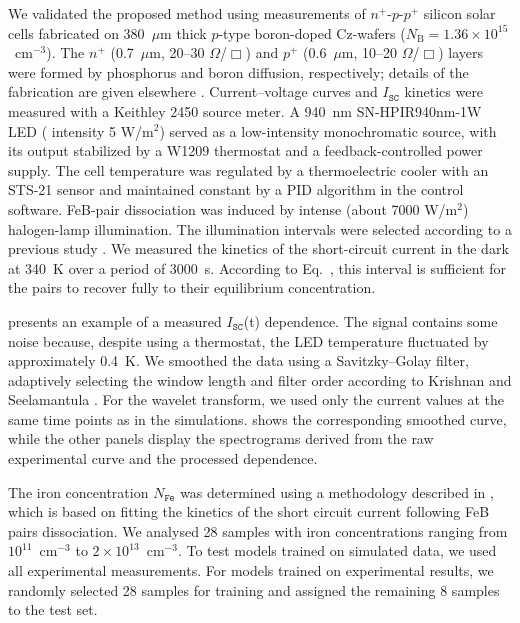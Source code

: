 \documentclass[10pt]{iopart}
\begin{document}
We validated the proposed method using measurements of $n^+$-$p$-$p^+$ silicon solar cells fabricated on 380~$\mu$m thick $p$-type boron-doped Cz-wafers ($N_\mathrm{B}=1.36\times10^{15}$~cm$^{-3}$). 
The $n^+$ (0.7~$\mu$m, 20–30 $\Omega$/$\Box$) and $p^+$ (0.6~$\mu$m, 10–20 $\Omega$/$\Box$) layers were formed by phosphorus and boron diffusion, respectively; details of the fabrication are given elsewhere \cite{Olikh2021JAP}.
Current–voltage curves and $I_\mathtt{SC}$ kinetics were measured with a Keithley 2450 source meter. A 940~nm SN-HPIR940nm-1W LED ( intensity 5 W/m$^{2}$) served as a low-intensity monochromatic source, with its output stabilized by a W1209 thermostat and a feedback-controlled power supply. 
The cell temperature was regulated by a thermoelectric cooler with an STS-21 sensor and maintained constant by a PID algorithm in the control software. 
FeB-pair dissociation was induced by intense (about 7000 W/m$^{2}$) halogen-lamp illumination. 
The illumination intervals were selected according to a previous study \cite{OlikhPSSA}.
We measured the kinetics of the short-circuit current in the dark at 340~K over a period of 3000~s. 
According to Eq.~, this interval is sufficient for the pairs to recover fully to their equilibrium concentration.


 presents an example of a measured $I_\mathtt{SC}$(t) dependence. 
The signal contains some noise because, despite using a thermostat, the LED temperature fluctuated by approximately 0.4~K. 
We smoothed the data using a Savitzky–Golay filter, adaptively selecting the window length and filter order according to Krishnan and Seelamantula \cite{Krishnan2013}. 
For the wavelet transform, we used only the current values at the same time points as in the simulations. 
 shows the corresponding smoothed curve, while the other panels display the spectrograms derived from the raw experimental curve and the processed dependence.


The iron concentration $N_\mathtt{Fe}$ was determined using a methodology described in \cite{Olikh2022:JMatSci,Olikh2021JAP}, which is based on fitting the kinetics of the short circuit current following FeB pairs dissociation.
We analysed 28 samples with iron concentrations ranging from $10^{11}$~cm$^{-3}$ to $2\times10^{13}$~cm$^{-3}$. 
To test models trained on simulated data, we used all experimental measurements. 
For models trained on experimental results, we randomly selected 28 samples for training and assigned the remaining 8 samples to the test set.
\end{document}
